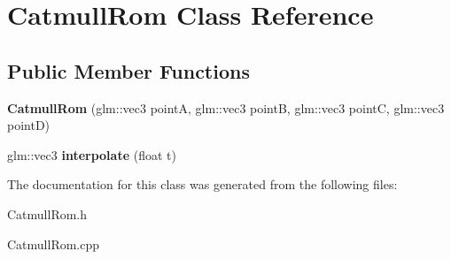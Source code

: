 \hypertarget{class_catmull_rom}{}\section{Catmull\+Rom Class Reference}
\label{class_catmull_rom}
\subsection*{Public Member Functions}
\begin{DoxyCompactItemize}
\item 
\mbox{\label{class_catmull_rom_a7c2ba84389cd456dd74cfc817fd6ae46}} 
{\bfseries Catmull\+Rom} (glm\+::vec3 pointA, glm\+::vec3 pointB, glm\+::vec3 pointC, glm\+::vec3 pointD)
\item 
\mbox{\label{class_catmull_rom_af77bf819993de8e541d3a7db5825faae}} 
glm\+::vec3 {\bfseries interpolate} (float t)
\end{DoxyCompactItemize}


The documentation for this class was generated from the following files\+:\begin{DoxyCompactItemize}
\item 
Catmull\+Rom.\+h\item 
Catmull\+Rom.\+cpp\end{DoxyCompactItemize}
